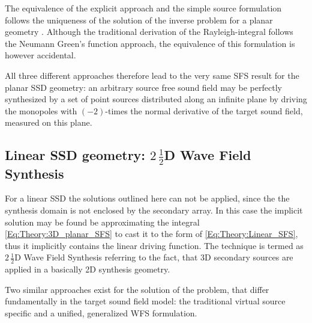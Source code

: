 The equivalence of the explicit approach and the simple source formulation follows the uniqueness of the solution of the inverse problem for a planar geometry \cite{Fazi2010}. Although the traditional derivation of the Rayleigh-integral follows the Neumann Green's function approach, the equivalence of this formulation is however accidental.

All three different approaches therefore lead to the very same SFS result for the planar SSD geometry: an arbitrary source free sound field may be perfectly synthesized by a set of point sources distributed along an infinite plane by driving the monopoles with $(-2)$-times the normal derivative of the target sound field, measured on this plane.

\subsection{Linear SSD geometry: $2\, \frac{1}{2}$D Wave Field Synthesis}

For a linear SSD the solutions outlined here can not be applied, since the the synthesis domain is not enclosed by the secondary array. In this case the implicit solution may be found be approximating the integral \eqref{Eq:Theory:3D_planar_SFS} to cast it to the form of \eqref{Eq:Theory:Linear_SFS}, thus it implicitly contains the linear driving function. The technique is termed as 
$2\, \frac{1}{2}$D Wave Field Synthesis referring to the fact, that 3D secondary sources are applied in a basically 2D synthesis geometry.

Two similar approaches exist for the solution of the problem, that differ fundamentally in the target sound field model: the traditional virtual source specific and a unified, generalized WFS formulation.

